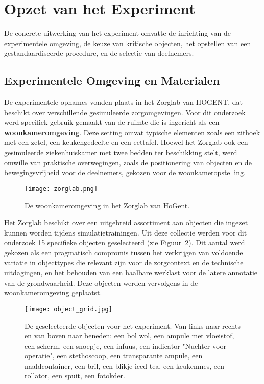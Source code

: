 \section{Opzet van het Experiment}

De concrete uitwerking van het experiment omvatte de inrichting van de experimentele omgeving, de keuze van kritische objecten, het opstellen van een gestandaardiseerde procedure, en de selectie van deelnemers.

\subsection{Experimentele Omgeving en Materialen}

De experimentele opnames vonden plaats in het Zorglab van HOGENT, dat beschikt over verschillende gesimuleerde zorgomgevingen. 
Voor dit onderzoek werd specifiek gebruik gemaakt van de ruimte die is ingericht als een \textbf{woonkameromgeving}. 
Deze setting omvat typische elementen zoals een zithoek met een zetel, een keukengedeelte en een eettafel. 
Hoewel het Zorglab ook een gesimuleerde ziekenhuiskamer met twee bedden ter beschikking stelt, werd omwille van praktische overwegingen, 
zoals de positionering van objecten en de bewegingsvrijheid voor de deelnemers, gekozen voor de woonkameropstelling.

\begin{figure}[H]
  \centering
  \texttt{[image: zorglab.png]}
  \caption[]{\label{fig:zorglab} De woonkameromgeving in het Zorglab van HoGent.}
\end{figure}

Het Zorglab beschikt over een uitgebreid assortiment aan objecten die ingezet kunnen worden tijdens simulatietrainingen. 
Uit deze collectie werden voor dit onderzoek 15 specifieke objecten geselecteerd (zie Figuur~\ref{fig:object_grid}).
Dit aantal werd gekozen als een pragmatisch compromis tussen het verkrijgen van voldoende variatie in objecttypes 
die relevant zijn voor de zorgcontext en de technische uitdagingen, en het behouden van een haalbare werklast voor de latere annotatie van de grondwaarheid.
Deze objecten werden vervolgens in de woonkameromgeving geplaatst.

\begin{figure}[H]
  \centering
  \texttt{[image: object\_grid.jpg]}
  \caption[]{\label{fig:object_grid} De geselecteerde objecten voor het experiment. Van links naar rechts en van boven naar beneden: 
  een bol wol, een ampule met vloeistof, een scherm, een snoepje, een infuus, een indicator "Nuchter voor operatie", een stethoscoop, een transparante ampule, een naaldcontainer, een bril, een blikje iced tea, een keukenmes, een rollator, een spuit, een fotokder. 
  }
\end{figure}

